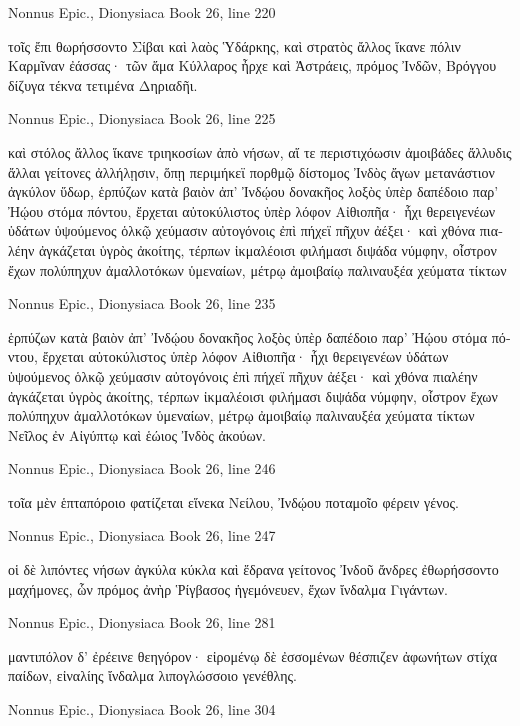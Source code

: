 \documentclass[12pt,letterpaper,twoside,final]{memoir}
\begin{document}
\begin{greek}
Nonnus Epic., Dionysiaca 
Book 26, line 220

τοῖς ἔπι θωρήσσοντο Σίβαι καὶ λαὸς Ὑδάρκης, 
καὶ στρατὸς ἄλλος ἵκανε πόλιν Καρμῖναν ἐάσσας· 
τῶν ἅμα Κύλλαρος ἦρχε καὶ Ἀστράεις, πρόμος Ἰνδῶν, 
Βρόγγου δίζυγα τέκνα τετιμένα Δηριαδῆι. 



Nonnus Epic., Dionysiaca 
Book 26, line 225

καὶ στόλος ἄλλος ἵκανε τριηκοσίων ἀπὸ νήσων, 
αἵ τε περιστιχόωσιν ἀμοιβάδες ἄλλυδις ἄλλαι 
γείτονες ἀλλήλῃσιν, ὅπῃ περιμήκεϊ πορθμῷ 
δίστομος Ἰνδὸς ἄγων μετανάστιον ἀγκύλον ὕδωρ, 
ἑρπύζων κατὰ βαιὸν ἀπ' Ἰνδῴου δονακῆος 
λοξὸς ὑπὲρ δαπέδοιο παρ' Ἠῴου στόμα πόντου, 
ἔρχεται αὐτοκύλιστος ὑπὲρ λόφον Αἰθιοπῆα· 
ἧχι θερειγενέων ὑδάτων ὑψούμενος ὁλκῷ 
χεύμασιν αὐτογόνοις ἐπὶ πήχεϊ πῆχυν ἀέξει· 
καὶ χθόνα πιαλέην ἀγκάζεται ὑγρὸς ἀκοίτης, 
τέρπων ἰκμαλέοισι φιλήμασι διψάδα νύμφην, 
οἶστρον ἔχων πολύπηχυν ἀμαλλοτόκων ὑμεναίων, 
μέτρῳ ἀμοιβαίῳ παλιναυξέα χεύματα τίκτων 




Nonnus Epic., Dionysiaca 
Book 26, line 235

ἑρπύζων κατὰ βαιὸν ἀπ' Ἰνδῴου δονακῆος 
λοξὸς ὑπὲρ δαπέδοιο παρ' Ἠῴου στόμα πόντου, 
ἔρχεται αὐτοκύλιστος ὑπὲρ λόφον Αἰθιοπῆα· 
ἧχι θερειγενέων ὑδάτων ὑψούμενος ὁλκῷ 
χεύμασιν αὐτογόνοις ἐπὶ πήχεϊ πῆχυν ἀέξει· 
καὶ χθόνα πιαλέην ἀγκάζεται ὑγρὸς ἀκοίτης, 
τέρπων ἰκμαλέοισι φιλήμασι διψάδα νύμφην, 
οἶστρον ἔχων πολύπηχυν ἀμαλλοτόκων ὑμεναίων, 
μέτρῳ ἀμοιβαίῳ παλιναυξέα χεύματα τίκτων 
Νεῖλος ἐν Αἰγύπτῳ καὶ ἑώιος Ἰνδὸς ἀκούων. 



Nonnus Epic., Dionysiaca 
Book 26, line 246

τοῖα μὲν ἑπταπόροιο φατίζεται εἵνεκα Νείλου, 
Ἰνδῴου ποταμοῖο φέρειν γένος. 



Nonnus Epic., Dionysiaca 
Book 26, line 247

                                     οἱ δὲ λιπόντες 
νήσων ἀγκύλα κύκλα καὶ ἕδρανα γείτονος Ἰνδοῦ 
ἄνδρες ἐθωρήσσοντο μαχήμονες, ὧν πρόμος ἀνὴρ 
Ῥίγβασος ἡγεμόνευεν, ἔχων ἴνδαλμα Γιγάντων. 



Nonnus Epic., Dionysiaca 
Book 26, line 281

μαντιπόλον δ' ἐρέεινε θεηγόρον· εἰρομένῳ δὲ   
ἐσσομένων θέσπιζεν ἀφωνήτων στίχα παίδων, 
εἰναλίης ἴνδαλμα λιπογλώσσοιο γενέθλης. 



Nonnus Epic., Dionysiaca 
Book 26, line 304


\end{greek}
\end{document}
